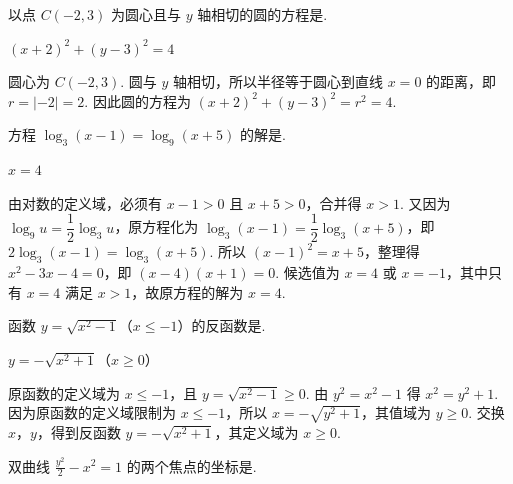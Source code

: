 \documentclass[UTF8,a4paper,oneside,11pt]{ctexbook}
\begin{document}
\begin{problem}
以点 \(C(-2,3) \) 为圆心且与 \(y\) 轴相切的圆的方程是\fillinblank{}.
\end{problem}

\begin{answer}
\((x + 2)^2 + (y - 3)^2 = 4\)
\end{answer}

\begin{solution}
圆心为 \(C(-2,3)\). 圆与 \(y\) 轴相切，所以半径等于圆心到直线 \(x=0\) 的距离，即 \(r=|-2|=2\). 因此圆的方程为
\((x+2)^2+(y-3)^2=r^2=4\).
\end{solution}

\begin{problem}
方程 \(\log_{3}(x-1)=\log_{9}(x+5) \) 的解是\fillinblank{}.
\end{problem}

\begin{answer}
\(x = 4\)
\end{answer}

\begin{solution}
由对数的定义域，必须有 \(x-1>0\) 且 \(x+5>0\)，合并得 \(x>1\). 又因为 \(\log_9u=\dfrac12\log_3u\)，原方程化为
\(\log_3(x-1)=\dfrac12\log_3(x+5)\)，即 \(2\log_3(x-1)=\log_3(x+5)\). 所以 \((x-1)^2=x+5\)，整理得 \(x^2-3x-4=0\)，即 \((x-4)(x+1)=0\). 候选值为 \(x=4\) 或 \(x=-1\)，其中只有 \(x=4\) 满足 \(x>1\)，故原方程的解为 \(x=4\).
\end{solution}

\begin{problem}
函数 \(y=\sqrt{x^{2}-1}\)（\(x\leqslant-1\)）的反函数是\fillinblank{}.
\end{problem}

\begin{answer}
\(y = -\sqrt{x^{2} + 1}\)（\(x \geqslant 0\)）
\end{answer}

\begin{solution}
原函数的定义域为 \(x\leqslant-1\)，且 \(y=\sqrt{x^2-1}\geqslant0\). 由 \(y^2=x^2-1\) 得 \(x^2=y^2+1\). 因为原函数的定义域限制为 \(x\leqslant-1\)，所以 \(x=-\sqrt{y^2+1}\)，其值域为 \(y\geqslant0\). 交换 \(x\)，\(y\)，得到反函数
\(y=-\sqrt{x^2+1}\)，其定义域为 \(x\geqslant0\).
\end{solution}

\begin{problem}
双曲线 \(\frac{y^{2}}{2}-x^{2}=1 \) 的两个焦点的坐标是\fillinblank{}.
\end{problem}
\end{document}
